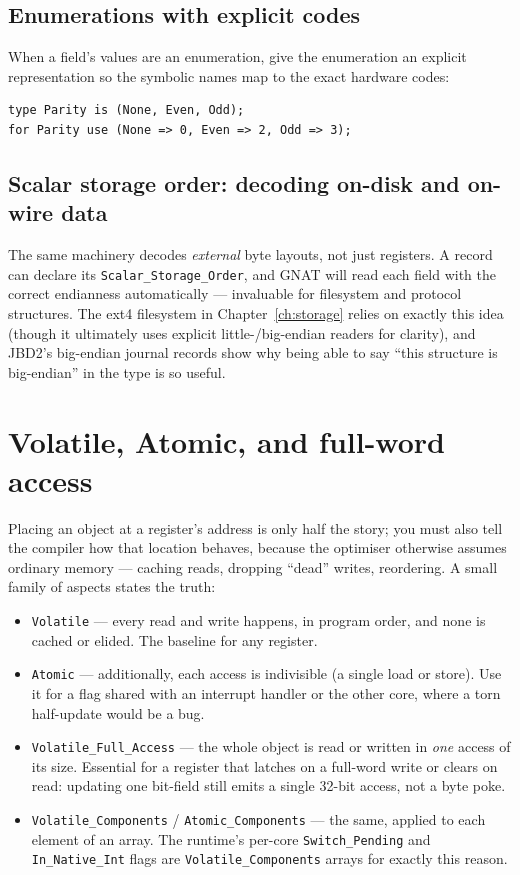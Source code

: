 \subsection{Enumerations with explicit codes}

When a field's values are an enumeration, give the enumeration an explicit
representation so the symbolic names map to the exact hardware codes:

\begin{lstlisting}
type Parity is (None, Even, Odd);
for Parity use (None => 0, Even => 2, Odd => 3);
\end{lstlisting}

\subsection{Scalar storage order: decoding on-disk and on-wire data}

The same machinery decodes \emph{external} byte layouts, not just registers. A
record can declare its \texttt{Scalar\_Storage\_Order}, and GNAT will read each
field with the correct endianness automatically --- invaluable for filesystem
and protocol structures. The ext4 filesystem in Chapter~\ref{ch:storage} relies
on exactly this idea (though it ultimately uses explicit little-/big-endian
readers for clarity), and JBD2's big-endian journal records show why being able
to say ``this structure is big-endian'' in the type is so useful.

\section{Volatile, Atomic, and full-word access}
\label{sec:volatile}

Placing an object at a register's address is only half the story; you must also
tell the compiler how that location behaves, because the optimiser otherwise
assumes ordinary memory --- caching reads, dropping ``dead'' writes, reordering.
A small family of aspects states the truth:

\begin{itemize}
  \item \texttt{Volatile} --- every read and write happens, in program order, and
        none is cached or elided. The baseline for any register.
  \item \texttt{Atomic} --- additionally, each access is indivisible (a single
        load or store). Use it for a flag shared with an interrupt handler or the
        other core, where a torn half-update would be a bug.
  \item \texttt{Volatile\_Full\_Access} --- the whole object is read or written in
        \emph{one} access of its size. Essential for a register that latches on a
        full-word write or clears on read: updating one bit-field still emits a
        single 32-bit access, not a byte poke.
  \item \texttt{Volatile\_Components} / \texttt{Atomic\_Components} --- the same,
        applied to each element of an array. The runtime's per-core
        \texttt{Switch\_Pending} and \texttt{In\_Native\_Int} flags are
        \texttt{Volatile\_Components} arrays for exactly this reason.
\end{itemize}

